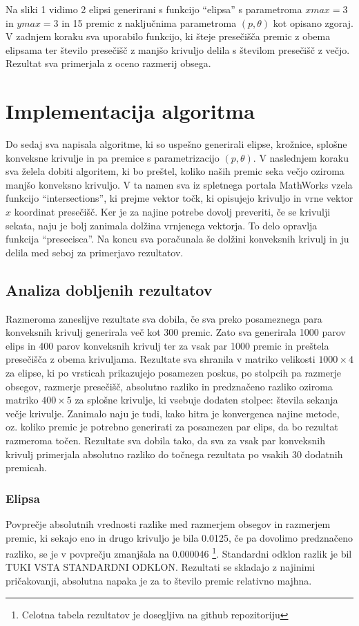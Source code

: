 \documentclass[a4paper]{article}
\begin{document}
Na sliki 1 vidimo 2 elipsi generirani s funkcijo ``elipsa'' s parametroma $xmax=3$ in $ymax=3$ in 15 premic z naključnima parametroma $(p, \theta)$ kot opisano zgoraj. V zadnjem koraku sva uporabilo funkcijo, ki šteje presečišča premic z obema elipsama ter število presečišč z manjšo krivuljo delila s številom presečišč z večjo. Rezultat sva primerjala z oceno razmerij obsega. 

\section{Implementacija algoritma}
Do sedaj sva napisala algoritme, ki so uspešno generirali elipse, krožnice, splošne konveksne krivulje in pa premice s parametrizacijo $(p, \theta)$. V naslednjem koraku sva želela dobiti algoritem, ki bo preštel, koliko naših premic seka večjo oziroma manjšo konveksno krivuljo. V ta namen sva iz spletnega portala MathWorks vzela funkcijo ``intersections'', ki prejme vektor točk, ki opisujejo krivuljo in vrne vektor $x$ koordinat presečišč. Ker je za najine potrebe dovolj preveriti, če se krivulji sekata, naju je bolj zanimala dolžina vrnjenega vektorja. To delo opravlja funkcija ``presecisca''. Na koncu sva poračunala še dolžini konveksnih krivulj in ju delila med seboj za primerjavo rezultatov.

\subsection{Analiza dobljenih rezultatov}
Razmeroma zaneslijve rezultate sva dobila, če sva preko posameznega para konveksnih krivulj generirala več kot 300 premic. Zato sva generirala 1000 parov elips in 400 parov konveksnih krivulj ter za vsak par 1000 premic in preštela presečišča z obema krivuljama. Rezultate sva shranila v matriko velikosti $1000 \times 4$ za elipse, ki po vrsticah prikazujejo posamezen poskus, po stolpcih pa razmerje obsegov, razmerje presečišč, absolutno razliko in predznačeno razliko oziroma matriko $400 \times 5$ za splošne krivulje, ki vsebuje dodaten stolpec: števila sekanja večje krivulje. 
Zanimalo naju je tudi, kako hitra je konvergenca najine metode, oz. koliko premic je potrebno generirati za posamezen par elips, da bo rezultat razmeroma točen. Rezultate sva dobila tako, da sva za vsak par konveksnih krivulj primerjala absolutno razliko do točnega rezultata po vsakih 30 dodatnih premicah. 


\subsubsection{Elipsa}
Povprečje absolutnih vrednosti razlike med razmerjem obsegov in razmerjem premic, ki sekajo eno in drugo krivuljo je bila 0.0125, če pa dovolimo predznačeno razliko, se je v povprečju zmanjšala na 0.000046 \footnote[1]{Celotna tabela rezultatov je dosegljiva na github repozitoriju}. Standardni odklon razlik je bil TUKI VSTA STANDARDNI ODKLON. Rezultati se skladajo z najinimi pričakovanji, absolutna napaka je za to število premic relativno majhna.
\end{document}
